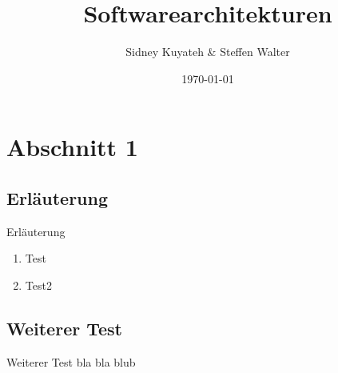 \documentclass{beamer}
\title{Softwarearchitekturen}
\author{Sidney Kuyateh \& Steffen Walter}
\institute{Duale Hochschule Baden-Württemberg}
\date{\today}
\begin{document}
	\maketitle
	\frame{\tableofcontents}
	\section{Abschnitt 1}
		\subsection{Erläuterung}
			\begin{frame}{Erläuterung}
				\begin{enumerate}
					\item Test
					\item Test2
				\end{enumerate}
			\end{frame}
		\subsection{Weiterer Test}
			\begin{frame}{Weiterer Test}
				bla bla blub
			\end{frame}
\end{document}
